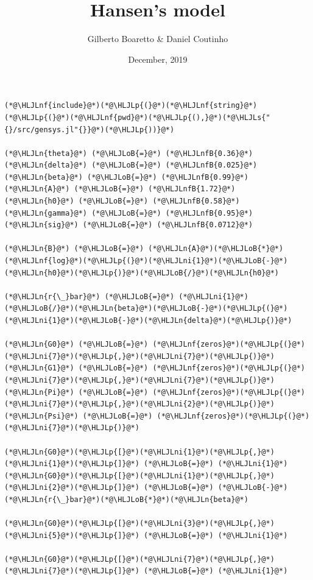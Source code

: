 \documentclass[12pt,a4paper]{article}
\title{ Hansen's model }
\author{ Gilberto Boaretto \& Daniel Coutinho }
\date{ December, 2019 }
\newcommand{\HLJLn}[1]{#1}
\newcommand{\HLJLnf}[1]{\textcolor[RGB]{66,102,213}{#1}}
\newcommand{\HLJLs}[1]{\textcolor[RGB]{201,61,57}{#1}}
\newcommand{\HLJLnfB}[1]{\textcolor[RGB]{59,151,46}{#1}}
\newcommand{\HLJLni}[1]{\textcolor[RGB]{59,151,46}{#1}}
\newcommand{\HLJLoB}[1]{\textcolor[RGB]{102,102,102}{\textbf{#1}}}
\newcommand{\HLJLp}[1]{#1}
\begin{document}
\maketitle


\begin{lstlisting}
(*@\HLJLnf{include}@*)(*@\HLJLp{(}@*)(*@\HLJLnf{string}@*)(*@\HLJLp{(}@*)(*@\HLJLnf{pwd}@*)(*@\HLJLp{(),}@*)(*@\HLJLs{"{}/src/gensys.jl"{}}@*)(*@\HLJLp{))}@*)

(*@\HLJLn{theta}@*) (*@\HLJLoB{=}@*) (*@\HLJLnfB{0.36}@*)
(*@\HLJLn{delta}@*) (*@\HLJLoB{=}@*) (*@\HLJLnfB{0.025}@*)
(*@\HLJLn{beta}@*) (*@\HLJLoB{=}@*) (*@\HLJLnfB{0.99}@*)
(*@\HLJLn{A}@*) (*@\HLJLoB{=}@*) (*@\HLJLnfB{1.72}@*)
(*@\HLJLn{h0}@*) (*@\HLJLoB{=}@*) (*@\HLJLnfB{0.58}@*)
(*@\HLJLn{gamma}@*) (*@\HLJLoB{=}@*) (*@\HLJLnfB{0.95}@*)
(*@\HLJLn{sig}@*) (*@\HLJLoB{=}@*) (*@\HLJLnfB{0.0712}@*)

(*@\HLJLn{B}@*) (*@\HLJLoB{=}@*) (*@\HLJLn{A}@*)(*@\HLJLoB{*}@*)(*@\HLJLnf{log}@*)(*@\HLJLp{(}@*)(*@\HLJLni{1}@*)(*@\HLJLoB{-}@*)(*@\HLJLn{h0}@*)(*@\HLJLp{)}@*)(*@\HLJLoB{/}@*)(*@\HLJLn{h0}@*)

(*@\HLJLn{r{\_}bar}@*) (*@\HLJLoB{=}@*) (*@\HLJLni{1}@*)(*@\HLJLoB{/}@*)(*@\HLJLn{beta}@*)(*@\HLJLoB{-}@*)(*@\HLJLp{(}@*)(*@\HLJLni{1}@*)(*@\HLJLoB{-}@*)(*@\HLJLn{delta}@*)(*@\HLJLp{)}@*)

(*@\HLJLn{G0}@*) (*@\HLJLoB{=}@*) (*@\HLJLnf{zeros}@*)(*@\HLJLp{(}@*)(*@\HLJLni{7}@*)(*@\HLJLp{,}@*)(*@\HLJLni{7}@*)(*@\HLJLp{)}@*)
(*@\HLJLn{G1}@*) (*@\HLJLoB{=}@*) (*@\HLJLnf{zeros}@*)(*@\HLJLp{(}@*)(*@\HLJLni{7}@*)(*@\HLJLp{,}@*)(*@\HLJLni{7}@*)(*@\HLJLp{)}@*)
(*@\HLJLn{Pi}@*) (*@\HLJLoB{=}@*) (*@\HLJLnf{zeros}@*)(*@\HLJLp{(}@*)(*@\HLJLni{7}@*)(*@\HLJLp{,}@*)(*@\HLJLni{2}@*)(*@\HLJLp{)}@*)
(*@\HLJLn{Psi}@*) (*@\HLJLoB{=}@*) (*@\HLJLnf{zeros}@*)(*@\HLJLp{(}@*)(*@\HLJLni{7}@*)(*@\HLJLp{)}@*)

(*@\HLJLn{G0}@*)(*@\HLJLp{[}@*)(*@\HLJLni{1}@*)(*@\HLJLp{,}@*)(*@\HLJLni{1}@*)(*@\HLJLp{]}@*) (*@\HLJLoB{=}@*) (*@\HLJLni{1}@*)
(*@\HLJLn{G0}@*)(*@\HLJLp{[}@*)(*@\HLJLni{1}@*)(*@\HLJLp{,}@*)(*@\HLJLni{2}@*)(*@\HLJLp{]}@*) (*@\HLJLoB{=}@*) (*@\HLJLoB{-}@*)(*@\HLJLn{r{\_}bar}@*)(*@\HLJLoB{*}@*)(*@\HLJLn{beta}@*)

(*@\HLJLn{G0}@*)(*@\HLJLp{[}@*)(*@\HLJLni{3}@*)(*@\HLJLp{,}@*)(*@\HLJLni{5}@*)(*@\HLJLp{]}@*) (*@\HLJLoB{=}@*) (*@\HLJLni{1}@*)

(*@\HLJLn{G0}@*)(*@\HLJLp{[}@*)(*@\HLJLni{7}@*)(*@\HLJLp{,}@*)(*@\HLJLni{7}@*)(*@\HLJLp{]}@*) (*@\HLJLoB{=}@*) (*@\HLJLni{1}@*)


\end{lstlisting}
\end{document}
